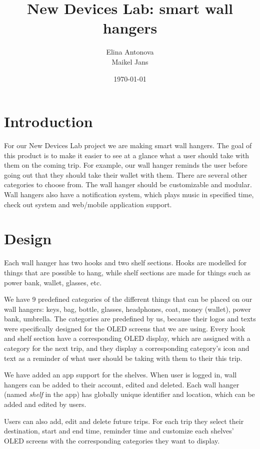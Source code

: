 \documentclass{article}
\title{New Devices Lab: smart wall hangers}
\author{Elina Antonova \quad \\ Maikel Jans \quad}
\date{\today}
\begin{document}
\maketitle

\tableofcontents

\newpage

\section{Introduction}
For our New Devices Lab project we are making smart wall hangers. The goal of this product is to make it easier to see at a glance what a user should take with them on the coming trip. For example, our wall hanger reminds the user before going out that they should take their wallet with them. There are several other categories to choose from. The wall hanger should be customizable and modular. Wall hangers also have a notification system, which plays music in specified time, check out system and web/mobile application support.

\section{Design}
Each wall hanger has two hooks and two shelf sections. Hooks are modelled for things that are possible to hang, while shelf sections are made for things such as power bank, wallet, glasses, etc.

We have 9 predefined categories of the different things that can be placed on our wall hangers: keys, bag, bottle, glasses, headphones, coat, money (wallet), power bank, umbrella. The categories are predefined by us, because their logos and texts were specifically designed for the OLED screens that we are using. Every hook and shelf section have a corresponding OLED display, which are assigned with a category for the next trip, and they display a corresponding category's icon and text as a reminder of what user should be taking with them to their this trip. 

We have added an app support for the shelves. When user is logged in, wall hangers can be added to their account, edited and deleted. Each wall hanger (named \textit{shelf} in the app) has globally unique identifier and location, which can be added and edited by users. 

Users can also add, edit and delete future trips. For each trip they select their destination, start and end time, reminder time and customize each shelves' OLED screens with the corresponding categories they want to display. 
\end{document}
